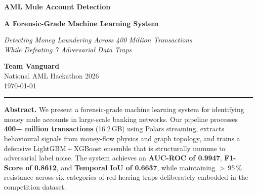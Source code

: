 \documentclass[11pt, a4paper]{article}
\begin{document}
\begin{titlepage}
\centering
\vspace*{3cm}

{\Huge\bfseries\sffamily AML Mule Account Detection\par}
\vspace{0.4cm}
{\Huge\bfseries\sffamily A Forensic-Grade Machine Learning System\par}

\vspace{1.8cm}

{\Large\itshape Detecting Money Laundering Across 400 Million Transactions\\[0.3em]
While Defeating 7 Adversarial Data Traps\par}

\vspace{2.5cm}

{\large\sffamily
\textbf{Team Vanguard}\\[0.6em]
National AML Hackathon 2026\\[0.4em]
\today\par}

\vspace{2.5cm}

\rule{0.55\textwidth}{0.5pt}

\vspace{1em}

\begin{minipage}{0.78\textwidth}\small
\textbf{Abstract.}\quad
We present a forensic-grade machine learning system for identifying money mule accounts in
large-scale banking networks. Our pipeline processes \textbf{400+ million transactions}
(16.2\,GB) using Polars streaming, extracts behavioural signals from money-flow physics and
graph topology, and trains a defensive LightGBM\,+\,XGBoost ensemble that is structurally
immune to adversarial label noise. The system achieves an \textbf{AUC-ROC of 0.9947},
\textbf{F1-Score of 0.8612}, and \textbf{Temporal IoU of 0.6637}, while maintaining
$>$\,95\,\% resistance across six categories of red-herring traps deliberately embedded in
the competition dataset.
\end{minipage}

\vfill
\end{titlepage}

\newpage
\tableofcontents
\newpage


\end{document}

